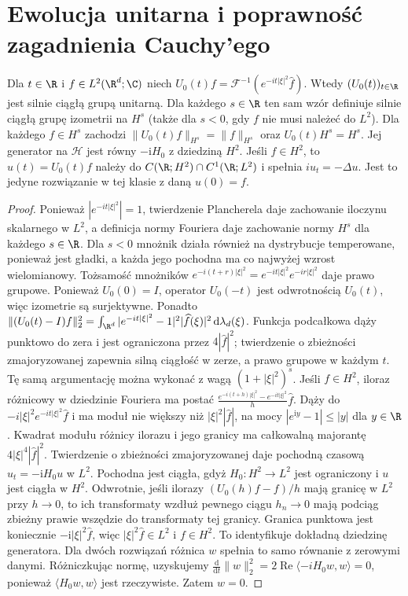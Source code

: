 \section{Ewolucja unitarna i poprawność zagadnienia Cauchy'ego}
\begin{twierdzenie}\label{thm:pde22-group}
Dla $t\in\R$ i $f\in L^2(\R^d;\C)$ niech
$U_0(t)f=\mathcal F^{-1}(e^{-it|\xi|^2}\widehat f)$.
Wtedy $(U_0(t))_{t\in\R}$ jest silnie ciągłą grupą
unitarną. Dla każdego $s\in\R$ ten sam wzór definiuje
silnie ciągłą grupę izometrii na $H^s$ (także
dla $s<0$, gdy $f$ nie musi należeć do $L^2$).
Dla każdego $f\in H^s$ zachodzi
$\|U_0(t)f\|_{H^s}=\|f\|_{H^s}$ oraz
$U_0(t)H^s=H^s$. Jej generator na $\mathcal H$
jest równy $-\mathrm iH_0$ z dziedziną $H^2$. Jeśli $f\in H^2$, to
$u(t)=U_0(t)f$ należy do
$C(\R;H^2)\cap C^1(\R;L^2)$ i spełnia
$i u_t=-\Delta u$. Jest to jedyne rozwiązanie w tej klasie
z daną $u(0)=f$.
\end{twierdzenie}
\begin{proof}
Ponieważ $|e^{-it|\xi|^2}|=1$, twierdzenie Plancherela
daje zachowanie iloczynu skalarnego w $L^2$,
a definicja normy Fouriera daje zachowanie normy
$H^s$ dla każdego $s\in\R$. Dla $s<0$ mnożnik
działa również na dystrybucje temperowane,
ponieważ jest gładki, a każda jego pochodna
ma co najwyżej wzrost wielomianowy.
Tożsamość mnożników
$e^{-i(t+r)|\xi|^2}=e^{-it|\xi|^2}e^{-ir|\xi|^2}$
daje prawo grupowe. Ponieważ $U_0(0)=I$,
operator $U_0(-t)$ jest odwrotnością $U_0(t)$,
więc izometrie są surjektywne.
Ponadto
$\|(U_0(t)-I)f\|_2^2=
\int_{\R^d}|e^{-it|\xi|^2}-1|^2|\widehat f(\xi)|^2\,\mathrm d\lambda_d(\xi)$.
Funkcja podcałkowa dąży punktowo do zera i jest ograniczona
przez $4|\widehat f|^2$; twierdzenie o zbieżności zmajoryzowanej
zapewnia silną ciągłość w zerze, a prawo grupowe w każdym $t$.
Tę samą argumentację można wykonać z wagą
$(1+|\xi|^2)^s$.
Jeśli $f\in H^2$, iloraz różnicowy w dziedzinie Fouriera
ma postać
$\frac{e^{-i(t+h)|\xi|^2}-e^{-it|\xi|^2}}h\widehat f$.
Dąży do $-i|\xi|^2e^{-it|\xi|^2}\widehat f$ i ma moduł
nie większy niż $|\xi|^2|\widehat f|$,
na mocy $|e^{\mathrm i y}-1|\le |y|$ dla $y\in\R$.
Kwadrat modułu różnicy ilorazu i jego granicy
ma całkowalną majorantę $4|\xi|^4|\widehat f|^2$.
Twierdzenie o zbieżności zmajoryzowanej daje
pochodną czasową $u_t=-\mathrm iH_0u$ w $L^2$.
Pochodna jest ciągła, gdyż $H_0:H^2\to L^2$
jest ograniczony i $u$ jest ciągła w $H^2$.
Odwrotnie, jeśli ilorazy
$(U_0(h)f-f)/h$ mają granicę w $L^2$ przy $h\to0$,
to ich transformaty wzdłuż pewnego ciągu $h_n\to0$
mają podciąg zbieżny prawie wszędzie do transformaty
tej granicy. Granica punktowa jest koniecznie
$-\mathrm i|\xi|^2\widehat f$, więc
$|\xi|^2\widehat f\in L^2$ i $f\in H^2$.
To identyfikuje dokładną dziedzinę generatora.
Dla dwóch rozwiązań
różnica $w$ spełnia to samo równanie z zerowymi danymi.
Różniczkując normę, uzyskujemy
$\frac{\mathrm d}{\mathrm dt}\|w\|_2^2=
2\operatorname{Re}\langle-iH_0w,w\rangle=0$,
ponieważ $\langle H_0w,w\rangle$ jest rzeczywiste.
Zatem $w=0$.
\end{proof}

